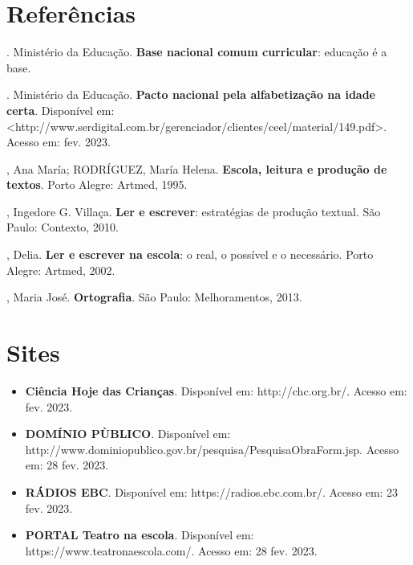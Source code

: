 \chapter{Referências}

\begin{bibliohedra}
. Ministério da Educação. \textbf{Base nacional comum curricular}:
educação é a base.

. Ministério da Educação. \textbf{Pacto nacional pela
alfabetização na idade certa}. Disponível em:
\textless{}http://www.serdigital.com.br/gerenciador/clientes/ceel/material/149.pdf\textgreater{}.
Acesso em: fev. 2023.

, Ana María; RODRÍGUEZ, María Helena. \textbf{Escola, leitura e
produção de textos}. Porto Alegre: Artmed, 1995.

, Ingedore G. Villaça. \textbf{Ler e escrever}: estratégias de
produção textual. São Paulo: Contexto, 2010.

, Delia. \textbf{Ler e escrever na escola}: o real, o possível e o
necessário. Porto Alegre: Artmed, 2002.

, Maria José. \textbf{Ortografia}. São Paulo: Melhoramentos,
2013.
\end{bibliohedra}

\chapter{Sites}

\begin{itemize}
\item\textbf{Ciência Hoje das Crianças}. Disponível em:
http://chc.org.br/. Acesso em: fev. 2023.

\item\textbf{DOMÍNIO PÙBLICO}. Disponível em:
http://www.dominiopublico.gov.br/pesquisa/PesquisaObraForm.jsp.
Acesso em: 28 fev. 2023.

\item\textbf{RÁDIOS EBC}. Disponível em: https://radios.ebc.com.br/. Acesso
em: 23 fev. 2023.

\item\textbf{PORTAL Teatro na escola}. Disponível em:
https://www.teatronaescola.com/. Acesso em: 28 fev. 2023.
\end{itemize}
